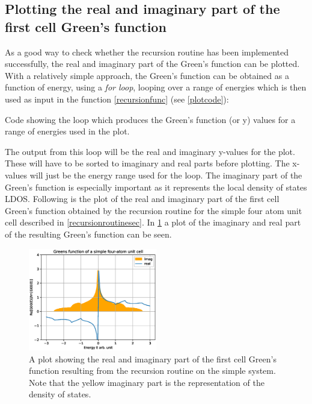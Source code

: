 \subsection{Plotting the real and imaginary part of the first cell Green's function}
As a good way to check whether the recursion routine has been implemented successfully, the real and imaginary part of the Green's function can be plotted. With a relatively simple approach, the Green's function can be obtained as a function of energy, using a \textit{for loop}, looping over a range of energies which is then used as input in the function \cref{recursionfunc} (see \cref{plotcode}):
\begin{listing}[ht]
    \caption{Code showing the loop which produces the Green's function (or y) values for a range of energies used in the plot.}
    \label{plotcode}
\end{listing}
The output from this loop will be the real and imaginary y-values for the plot. These will have to be sorted to imaginary and real parts before plotting. The x-values will just be the energy range used for the loop. The imaginary part of the Green's function is especially important as it represents the local density of states LDOS. Following is the plot of the real and imaginary part of the first cell Green's function obtained by the recursion routine for the simple four atom unit cell described in \cref{recursionroutinesec}. In \cref{imrealplot} a plot of the imaginary and real part of the resulting Green's function can be seen. 
\begin{figure}
    \centering
    \includegraphics[width = 0.5\textwidth]{Figures/imrealplot.eps}
    \caption{A plot showing the real and imaginary part of the first cell Green's function resulting from the recursion routine on the simple system. Note that the yellow imaginary part is the representation of the density of states.}
    \label{imrealplot}
\end{figure}
